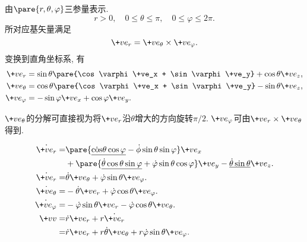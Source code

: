 \documentclass{ctexart}
\begin{document}
\begin{figure}[ht]
    \centering
\end{figure}
由$\pare{r,\theta,\varphi}$三参量表示.
\[ r>0,\quad 0\le\theta\le\pi,\quad 0\le\varphi\le 2\pi. \]
所对应基矢量满足
\[ \+ve_r = \+ve_\theta \times\+ve_\varphi. \]
变换到直角坐标系, 有
\begin{align*}
    \+ve_r &= \sin\theta\pare{\cos\varphi \+ve_x + \sin\varphi\+ve_y} + \cos\theta\+ve_z, \\
    \+ve_\theta &= \cos\theta\pare{\cos\varphi \+ve_x + \sin\varphi\+ve_y} -\sin\theta\+ve_z, \\
    \+ve_\varphi &= -\sin\varphi\+ve_x + \cos\varphi\+ve_y.
\end{align*}
\begin{remark}
    $\+ve_\theta$的分解可直接视为将$\+ve_r$沿$\theta$增大的方向旋转$\pi/2$. $\+ve_\varphi$可由$\+ve_r\times\+ve_\theta$得到.
\end{remark}
\begin{align*}
    \dot{\+ve_r} =& \pare{\underline{\dot\cos\theta\cos\varphi} - \dot{\phi}\sin\theta\sin\varphi}\+ve_x\\
    &+ \pare{\underline{\dot{\theta}\cos\theta\sin\varphi} + \dot{\varphi}\sin\theta\cos\varphi}\+ve_y - \underline{\dot{\theta}\sin\theta}\+ve_z.\\
    \dot{\+ve_r} =& \dot{\theta}\+ve_\theta + \dot{\varphi}\sin\theta\+ve_\varphi. \\
    \dot{\+ve_\theta} =& -\dot{\theta}\+ve_r + \dot{\varphi}\cos\theta\+ve_\varphi. \\
    \dot{\+ve_\varphi} =& -\dot{\varphi}\sin\theta\+ve_r - \dot{\varphi}\cos\theta\+ve_\theta. \\
    \+vv =& \dot{r}\+ve_r + r\dot{\+ve_r} \\
    =& \dot{r}\+ve_r + r\dot{\theta}\+ve_\theta+r\dot{\varphi}\sin\theta\+ve_\varphi.
\end{align*}
\begin{finale}
\end{finale}
\end{document}
